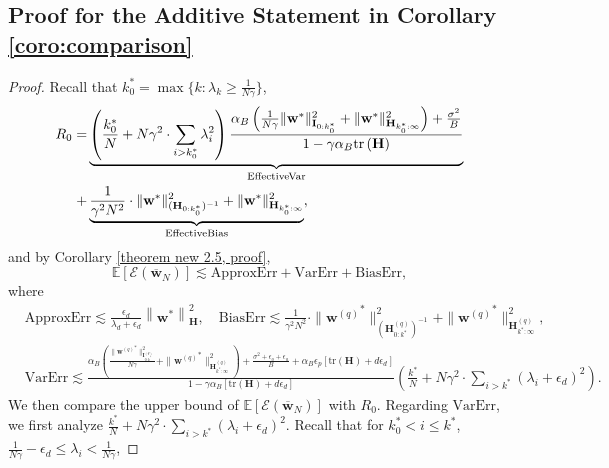 \documentclass[11pt, letterpaper]{article}
\begin{document}
\subsection{Proof for the Additive Statement in Corollary \ref{coro:comparison}}
\label{Proof for Theorem 12}
\begin{proof}
    Recall that $k_0^*=\max\{k: \lambda_k \geq \frac{1}{N\gamma}\}$,
    \begin{equation*}
        \begin{aligned}
            R_0=&\underbrace{\left(\frac{k_0^*}{N}+N\gamma^2\cdot\sum_{i>k_0^*}\lambda_i^2\right)\frac{\alpha_B\left(\frac{1}{N\gamma}\|{\mathbf{w}}^*\|_{\mathbf{I}_{0:k_0^*}}^2+\|{\mathbf{w}}^*\|_{\mathbf{H}_{k_0^*:\infty}}^2\right)
            +\frac{\sigma^2}{B}}{1-\gamma\alpha_B\mathrm{tr}\left(\mathbf{H}\right)}}_{\rm EffectiveVar}\\
            +&\underbrace{\frac{1}{\gamma^2N^2}\cdot\|      {\mathbf{w}}^*\|_{(\mathbf{H}_{0:k_0^*})^{-1}}^2+\|{\mathbf{w}}^*\|_{\mathbf{H}_{k_0^*:\infty}}^2}_{\rm EffectiveBias},
        \end{aligned}
    \end{equation*}
    and by Corollary \ref{theorem new 2.5, proof},
    \begin{equation*}
        \mathbb{E}[\mathcal{E}(\overline{\mathbf{w}}_N)] \lesssim \mathrm{ApproxErr}+\mathrm{ VarErr}+\mathrm{BiasErr},
    \end{equation*}
    where
    \begin{align*}
        &\mathrm{ApproxErr}\lesssim \frac{\epsilon_d}{\lambda_d+\epsilon_d}\left\|\mathbf{w}^*\right\|_\mathbf{H}^2,\quad \mathrm{BiasErr}\lesssim\frac{1}{\gamma^2N^2}\cdot\|{\mathbf{w}^{(q)}}^*\|_{(\mathbf{H}_{0:k^*}^{(q)})^{-1}}^2+\|{\mathbf{w}^{(q)}}^*\|_{\mathbf{H}_{k^*:\infty}^{(q)}}^2,\\
        &\mathrm{VarErr}\lesssim \frac{\alpha_B\left(\frac{\|{\mathbf{w}^{(q)}}^*\|_{\mathbf{I}_{0:k^*}^{(q)}}^2}{N\gamma}+\|{\mathbf{w}^{(q)}}^*\|_{\mathbf{H}_{k^*:\infty}^{(q)}}^2\right)+\frac{\sigma^2+\epsilon_o+\epsilon_a}{B}+\alpha_B \epsilon_p[\mathrm{tr}(\mathbf{H})+d\epsilon_d]}{1-\gamma\alpha_B[\mathrm{tr}(\mathbf{H})+d\epsilon_d]}\left(\frac{k^*}{N}+N\gamma^2\cdot\sum_{i>k^*}(\lambda_i+\epsilon_d)^2\right).
    \end{align*}
    We then compare the upper bound of $\mathbb{E}[\mathcal{E}(\overline{\mathbf{w}}_N)]$ with $R_0$. Regarding $\mathrm{VarErr}$, we first analyze $\frac{k^*}{N}+N\gamma^2\cdot\sum_{i>k^*}(\lambda_i+\epsilon_d)^2$. Recall that for $k_0^*< i \leq k^*$, $\frac{1}{N\gamma}-\epsilon_d\leq\lambda_i<\frac{1}{N\gamma}$,

\end{proof}
\end{document}
